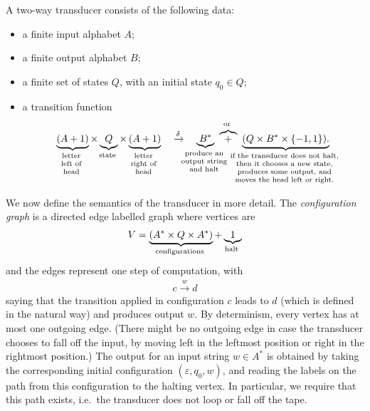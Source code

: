 \begin{definition}\label{def:two-way-transducer}
    A two-way  transducer consists of 
    the following data:
    \begin{itemize}
        \item a finite input alphabet $A$;
        \item a finite output alphabet $B$;
        \item a finite set of states $Q$, with an initial state $q_0 \in Q$;
        \item a transition function
        \begin{align*}
        \myunderbrace{(A+1)}{letter \\ left of \\  head} \times 
        \myunderbrace{Q}{state} \times 
        \myunderbrace{(A+1)}{letter \\ right of \\  head} 
       \quad  \xrightarrow \delta  \quad 
         \myunderbrace{B^*}{produce an \\ output string \\ and halt} 
         \ \myoverbrace{+}{or} \   
            \myunderbrace{(Q \times 
            B^* \times 
            \set{-1,1}).}{if the transducer does not halt, \\  then it chooses a new state, \\  produces some output, and  \\  moves the head  left or right.}
        \end{align*}
    \end{itemize}
\end{definition}
We now define the semantics of the transducer in more detail. The \emph{configuration graph} is a directed edge labelled  graph where vertices are 
\begin{align*}
V = \myunderbrace{(A^* \times Q \times A^*)}{configurations} + 
\myunderbrace 1 {halt}
\end{align*} 
and the edges represent one step of computation, with  
\begin{align*}
c \xrightarrow w d
\end{align*} 
saying that  the transition applied in configuration $c$ leads to $d$ (which is defined in the natural way) and produces output $w$. By determinism, every vertex has at most one outgoing edge. (There might be no outgoing edge in case the transducer chooses to fall off the input, by moving left in the leftmost position or right in the rightmost position.)  The output for an input string $w \in A^*$ is obtained by taking the corresponding initial configuration $(\varepsilon, q_0, w)$, and reading the labels on the path from this configuration to the halting vertex. In particular, we require that this path exists, i.e.~the transducer does not loop or fall off the tape.

